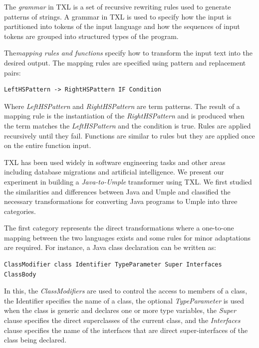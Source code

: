 The \textit{grammar} in TXL is a set of recursive rewriting rules used to generate patterns of strings. A grammar in TXL is used to specify how the input is partitioned into tokens of the input language and how the sequences of input tokens are grouped into structured types of the program. 

The\textit{mapping rules and functions} specify how to transform the input text into the desired output. The mapping rules are specified using pattern and replacement pairs: 

\vspace{\baselineskip}
\begin{lstlisting}[style=umplePlain]
LeftHSPattern -> RightHSPattern IF Condition
\end{lstlisting}

Where \textit{LeftHSPattern} and \textit{RightHSPattern} are term patterns. The result of a mapping rule is the instantiation of the \textit{RightHSPattern} and is produced when the term matches the \textit{LeftHSPattern} and the condition is true. Rules are applied recursively until they fail. Functions are similar to rules but they are applied once on the entire function input.

TXL has been used widely in software engineering tasks and other areas including database migrations and artificial intelligence. We present our experiment in building a \textit{Java-to-Umple} transformer using TXL. We first studied the similarities and differences between Java and Umple and classified the necessary transformations for converting Java programs to Umple into three categories.

The first category represents the direct transformations where a one-to-one mapping between the two languages exists and some rules for minor adaptations are required. For instance, a Java class declaration can be written as: 

\vspace{\baselineskip}
\begin{lstlisting}[style=umplePlain]
ClassModifier class Identifier TypeParameter Super Interfaces ClassBody
\end{lstlisting}

In this, the \textit{ClassModifiers} are used to control the access to members of a class, the Identifier specifies the name of a class, the optional \textit{TypeParameter} is used when the class is generic and declares one or more type variables, the \textit{Super} clause specifies the direct superclasses of the current class, and the \textit{Interfaces} clause specifies the name of the interfaces that are direct super-interfaces of the class being declared.

